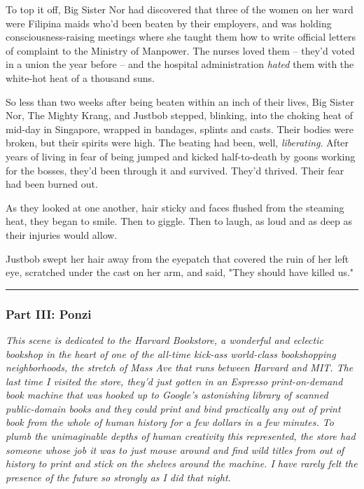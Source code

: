 To top it off, Big Sister Nor had discovered that three of the
women on her ward were Filipina maids who'd been beaten by their
employers, and was holding consciousness-raising meetings where she
taught them how to write official letters of complaint to the
Ministry of Manpower. The nurses loved them -- they'd voted in a
union the year before -- and the hospital administration
\emph{hated} them with the white-hot heat of a thousand suns.

So less than two weeks after being beaten within an inch of their
lives, Big Sister Nor, The Mighty Krang, and Justbob stepped,
blinking, into the choking heat of mid-day in Singapore, wrapped in
bandages, splints and casts. Their bodies were broken, but their
spirits were high. The beating had been, well, \emph{liberating}.
After years of living in fear of being jumped and kicked
half-to-death by goons working for the bosses, they'd been through
it and survived. They'd thrived. Their fear had been burned out.

As they looked at one another, hair sticky and faces flushed from
the steaming heat, they began to smile. Then to giggle. Then to
laugh, as loud and as deep as their injuries would allow.

Justbob swept her hair away from the eyepatch that covered the ruin
of her left eye, scratched under the cast on her arm, and said,
"They should have killed us."

\begin{center}\rule{3in}{0.4pt}\end{center}

\subsubsection{Part III: Ponzi}

\emph{This scene is dedicated to the Harvard Bookstore, a wonderful and eclectic bookshop in the heart of one of the all-time kick-ass world-class bookshopping neighborhoods, the stretch of Mass Ave that runs between Harvard and MIT. The last time I visited the store, they'd just gotten in an Espresso print-on-demand book machine that was hooked up to Google's astonishing library of scanned public-domain books and they could print and bind practically any out of print book from the whole of human history for a few dollars in a few minutes. To plumb the unimaginable depths of human creativity this represented, the store had someone whose job it was to just mouse around and find wild titles from out of history to print and stick on the shelves around the machine. I have rarely felt the presence of the future so strongly as I did that night.}

